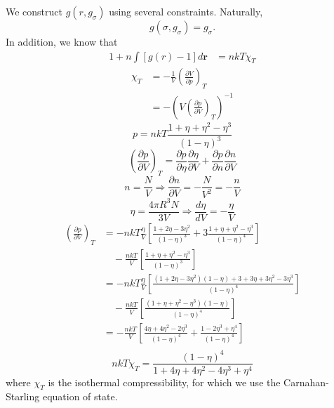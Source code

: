 \documentclass[letterpaper,twocolumn,amsmath,amssymb,pre,aps,10pt]{revtex4-1}
\newcommand{\red}[1]{{\bf \color{red} #1}}
\newcommand{\rr}{\textbf{r}}
\newcommand{\fixme}[1]{\text{\red{[#1]}}}
\begin{document}
We construct $g(r, g_\sigma)$ using several constraints.  Naturally,
\begin{equation}
  g(\sigma, g_\sigma) = g_\sigma.
\end{equation}
In addition, we know that
\begin{align}
  1 + n\int\left[g(r)-1\right]d\rr &= nkT\chi_T
\end{align}
\begin{equation}
  \begin{split}
    \chi_T  &= -\frac{1}{V}\left(\frac{\partial V}{\partial
      p}\right)_T \\
    &= - \left(V\left(\frac{\partial p}{\partial
      V}\right)_T\right)^{-1}
  \end{split}
\end{equation}
\begin{equation}
    p = nkT\frac{1+\eta+\eta^2-\eta^3}{(1-\eta)^3}
\end{equation}
\begin{equation}
    \left(\frac{\partial p}{\partial V}\right)_T = \frac{\partial p}{\partial\eta}\frac{\partial\eta}{\partial V} + \frac{\partial p}{\partial n}\frac{\partial n}{\partial V}
\end{equation}
\begin{equation}
    n = \frac{N}{V}\Longrightarrow \frac{\partial n}{\partial V} = -\frac{N}{V^2} = -\frac{n}{V}
\end{equation}
\begin{equation}
    \eta = \frac{4\pi R^3N}{3V}\Longrightarrow \frac{d\eta}{dV} = -\frac{\eta}{V}
\end{equation}
\begin{equation}
  \begin{split}
    \left(\frac{\partial p}{\partial V}\right)_T &= -nkT\frac{\eta}{V}\left[\frac{1 + 2\eta - 3\eta^2}{(1-\eta)^3} + 3\frac{1 + \eta + \eta^2 - \eta^3}{(1-\eta)^4}\right]\\
    &\quad  - \frac{nkT}{V}\left[\frac{1+\eta+\eta^2-\eta^3}{(1-\eta)^3}\right]\\
    &= -nkT\frac{\eta}{V}\left[\frac{(1+2\eta-3\eta^2)(1-\eta) + 3 + 3\eta + 3\eta^2 - 3\eta^3}{(1-\eta)^4}\right]\\
    &\quad  - \frac{nkT}{V}\left[\frac{(1+\eta+\eta^2-\eta^3)(1-\eta)}{(1-\eta)^4}\right]\\
    &= -\frac{nkT}{V}\left[\frac{4\eta + 4\eta^2 - 2\eta^3}{(1-\eta)^4} + \frac{1 - 2\eta^3 + \eta^4}{(1-\eta)^4}\right]\\
  \end{split}
\end{equation}
\begin{equation}
    nkT\chi_T = \frac{(1-\eta)^4}{1 + 4\eta + 4\eta^2 - 4\eta^3 + \eta^4}
\end{equation}
where $\chi_T$ is the isothermal compressibility, for which we use the
Carnahan-Starling equation of state.
\end{document}
